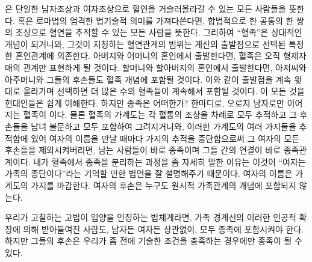 은 단일한 남자조상과 여자조상으로 혈연을 거슬러올라갈 수 있는
모든 사람들을 뜻한다.
혹은 로마법의 엄격한 법기술적 의미를 가져다쓴다면,
합법적으로 한 공통의 한 쌍의 조상으로
혈연을 추적할 수 있는 모든 사람을 뜻한다.
그리하여 ``혈족''은 상대적인 개념이 되거니와,
그것이 지칭하는 혈연관계의 범위는 계산의 출발점으로 선택된
특정한 혼인관계에 의존한다.
아버지와 어머니의 혼인에서 출발한다면, 혈족은 오직
형제자매의 관계만 표현하게 될 것이다.
할머니와 할아버지의 혼인에서 출발한다면, 아저씨와 아주머니와 그들의 후손들도
혈족 개념에 포함될 것이다.
이와 같이 출발점을 계속 윗대로 올라가며 선택하면 더 많은 수의 혈족들이
계속해서 포함될 것이다.
이 모든 것을 현대인들은 쉽게 이해한다.
하지만 종족은 어떠한가?
한마디로, 오로지 남자로만 이어지는 혈족이 이다.
물론 혈족의 가계도는 각 혈통의 조상을 차례로 모두 추적하고
그 후손들을 남녀 불문하고 모두 포함하여 그려지거니와,
이러한 가계도의 여러 가지들을 추적함에 있어
여자의 이름을 만날 때마다 가지의 추적을 중단함으로써
그 여자의 모든 후손들을 제외시켜버리면,
남는 사람들이 바로 종족이며 그들 간의 연결이 바로 종족관계이다.
내가 혈족에서 종족을 분리하는 과정을 좀 자세히 말한 이유는 이것이
``여자는 가족의 종단이다''라는
기억할 만한 법언을 잘 설명해주기 때문이다.
여자의 이름은 가계도의 가지를 마감한다.
여자의 후손은 누구도 원시적 가족관계의 개념에 포함되지 않는다.

우리가 고찰하는 고법이 입양을 인정하는 법체계라면,
가족 경계선의 이러한 인공적 확장에 의해 받아들여진 사람도,
남자든 여자든 상관없이, 모두 종족에 포함시켜야 한다.
하지만 그들의 후손은 우리가 좀 전에 기술한 조건을 충족하는 경우에만
종족이 될 수 있다.

